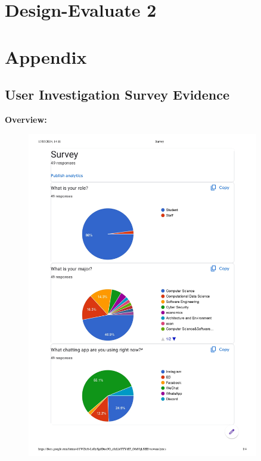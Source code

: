 \documentclass[12pt]{article}
\begin{document}
\newpage

\section{Design-Evaluate 2}

\section{Appendix}

\subsection{User Investigation Survey Evidence}
\label{survey}
\textbf{Overview:}

\begin{figure}[H]
    \centering
    \includegraphics[width=0.9\textwidth]{graphs/Survey-summary_page-0001.jpg}
\end{figure}
\end{document}
